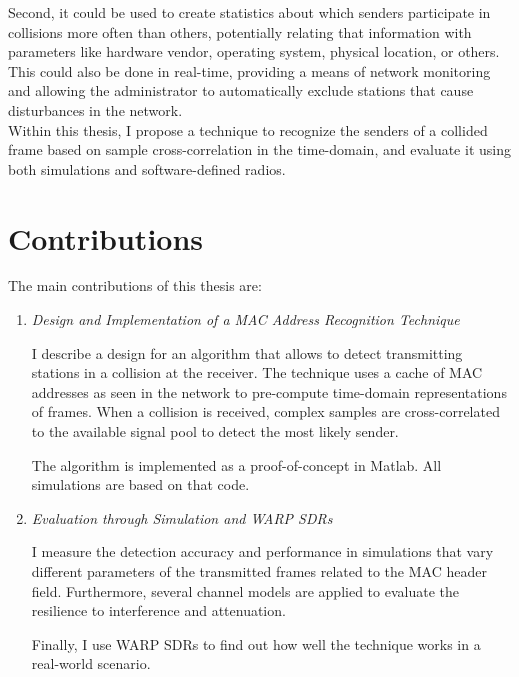 Second, it could be used to create statistics about which senders participate in collisions more often than others, potentially relating that information with parameters like hardware vendor, operating system, physical location, or others. This could also be done in real-time, providing a means of network monitoring and allowing the administrator to automatically exclude stations that cause disturbances in the network.\\

Within this thesis, I propose a technique to recognize the senders of a collided frame based on sample cross-correlation in the time-domain, and evaluate it using both simulations and software-defined radios.

\clearpage



\section{Contributions}

The main contributions of this thesis are:

\begin{enumerate}
	\item \textit{Design and Implementation of a MAC Address Recognition Technique}

	I describe a design for an algorithm that allows to detect transmitting stations in a collision at the receiver. The technique uses a cache of \gls{MAC} addresses as seen in the network to pre-compute time-domain representations of frames. When a collision is received, complex samples are cross-correlated to the available signal pool to detect the most likely sender.

	The algorithm is implemented as a proof-of-concept in Matlab. All simulations are based on that code.

	\item \textit{Evaluation through Simulation and WARP SDRs}

	I measure the detection accuracy and performance in simulations that vary different parameters of the transmitted frames related to the \gls{MAC} header field. Furthermore, several channel models are applied to evaluate the resilience to interference and attenuation.

	Finally, I use \gls{WARP} \glspl{SDR} to find out how well the technique works in a real-world scenario.
\end{enumerate}


